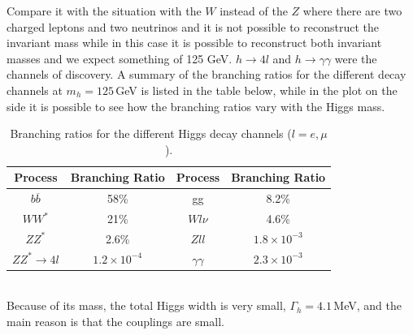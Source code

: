 \documentclass[../main.tex]{subfiles}
\begin{document}
Compare it with the situation with the $W$ instead of the $Z$ where there are two charged leptons and two neutrinos and it is not possible to reconstruct the invariant  mass while in this case it is possible to reconstruct both invariant masses and we expect something of 125 GeV. $h\to4l$ and $h\to\gamma\gamma$ were the channels of discovery. A summary of the branching ratios for the different decay channels at $m_h=125$\,GeV is listed in the table below, while in the plot on the side it is possible to see how the branching ratios vary with the Higgs mass.
\begin{table}[h]
    \centering
    \begin{tabular}{c|c||c|c}
    \hline
    \rowcolor{gray!45}Process & Branching Ratio & Process & Branching Ratio\\
    \hline
    $b\overline{b}$ & 58\% & gg & 8.2\%\\
    $WW^*$ & 21\% & $Wl\nu$ & 4.6\%\\
    $ZZ^*$ & 2.6\% & $Zll$ & $1.8\times10^{-3}$\\
    $ZZ^*\to4l$ & $1.2\times10^{-4}$ & $\gamma\gamma$ & $2.3\times10^{-3}$\\
    \hline
    \end{tabular}
    \caption{Branching ratios for the different Higgs decay channels ($l=e,\mu$).}
\end{table}\\
Because of its mass, the total Higgs width is very small,  $\Gamma_h=4.1$\,MeV, and the main reason is that the couplings are small.
\end{document}
